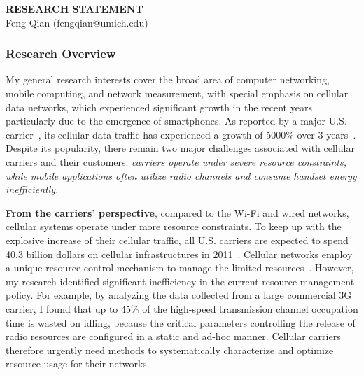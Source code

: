 \documentclass[10pt]{article}
\begin{document}
\begin{small}

\begin{center}
{\LARGE \bf RESEARCH STATEMENT}\\
\vspace*{0.1cm}
{\normalsize Feng Qian (fengqian@umich.edu)}
\end{center}



\subsubsection*{Research Overview}


My general research interests cover the broad area of computer networking, mobile computing, and network measurement, with special emphasis on cellular data networks, which experienced significant growth in the recent years particularly due to the emergence of smartphones. As reported by a major U.S. carrier~\cite{erman11}, its cellular data traffic has experienced a growth of 5000\% over 3 years~\cite{erman11}. Despite its popularity, there remain two major challenges associated with cellular carriers and their customers: \emph{carriers operate under severe resource constraints, while mobile applications often utilize radio channels and consume handset energy inefficiently.}

\textbf{From the carriers' perspective}, compared to the Wi-Fi and wired networks, cellular systems operate under more resource constraints. To keep up with the explosive increase of their cellular traffic, all U.S. carriers are expected to spend 40.3 billion dollars on cellular infrastructures in 2011~\cite{cellular_cost}. Cellular networks employ a unique resource control mechanism to manage the limited resources~\cite{hspabook}. However, my research identified significant inefficiency in the current resource management policy. For example, by analyzing the data collected from a large commercial 3G carrier, I found that up to 45\% of the high-speed transmission channel occupation time is wasted on idling, because the critical parameters controlling the release of radio resources are configured in a static and ad-hoc manner. Cellular carriers therefore urgently need methods to systematically characterize and optimize resource usage for their networks.


\end{small}
\end{document}

